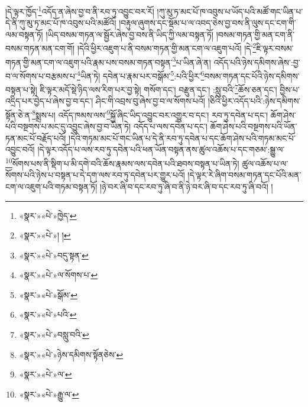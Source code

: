 །དེ་ལྟར་ཁྱོད་\footnote{«སྣར་»«པེ་»ཁྱེད་}འདོད་ན་ཞེས་བྱ་བ་ནི་རབ་ཏུ་འབྱུང་བར་རོ། །ཀུ་མུ་ཏ་མང་པོ་ཁ་འབུས་པ་ཡོད་པའི་མཚོ་གང་ཡིན་པ་དེ་ནི་ཀུ་མུ་ཏ་མང་པོ་ཁ་འབུས་པའི་མཚོའོ། །བརྟུལ་ཞུགས་དང་སྡོམ་པ་ལ་འབད་ཅེས་བྱ་བས་ནི་ལུས་དང་ངག་གི་ལམ་བསྟན་ཏོ། །ཡིད་བསམ་གཏན་ལ་སྦྱོར་ཞེས་བྱ་བས་ནི་ཡིད་ཀྱི་ལམ་བསྟན་ཏོ། །བསམ་གཏན་གྱི་མན་ངག་ནི་བསམ་གཏན་མན་ངག་གོ། །དེའི་ཕྱིར་འཇུག་པ་ནི་བསམ་གཏན་གྱི་མན་ངག་ལ་འཇུག་པའོ། །དེ་\footnote{«སྣར་»«པེ་»། །}ཇི་ལྟར་བསམ་གཏན་གྱི་མན་ངག་ལ་འཇུག་པའི་རྣམ་པས་བསམ་གཏན་བསྟན་\footnote{«སྣར་»«པེ་»བདུ་སྟན་}པ་ཡིན་ཞེ་ན། འདོད་པའི་ཉེས་དམིགས་ཞེས་:བྱ་བ་ལ་སོགས་པ་བརྩམས་པ་\footnote{«སྣར་»«པེ་»ལ་སོགས་པ་}ཡིན་ཏེ། དབེན་པ་རྣམ་པར་བསྒོམ་\footnote{«སྣར་»«པེ་»སྒོམ་}:པའི་ཕྱིར་\footnote{«སྣར་»«པེ་»པའི་}བསམ་གཏན་དང་པོའི་ཉེས་དམིགས་བསྟན་པ་སྟེ། ཇི་ལྟར་མདོ་སྡེ་ཉིད་ལས་རིག་པར་བྱ་སྟེ། གསོག་དང་། བརྫུན་དང་། :སླུ་བའི་\footnote{«སྣར་»«པེ་»བསླུ་བའི་}ཆོས་ཅན་དང་། བྱིས་པ་འདྲིད་པར་བྱེད་པ་ཞེས་བྱ་བ་དང་། ཤིང་གི་འབྲས་བུ་ཞེས་བྱ་བ་ལ་སོགས་པའོ། །ཅིའི་ཕྱིར་འདོད་པའི་:ཉེས་དམིགས་སྟོན་ཅེ་ན་\footnote{«སྣར་»«པེ་»ཉེས་དམིགས་སྟོནཅེས་}སྨྲས་པ། འདོད་ཁམས་ལས་\footnote{«སྣར་»«པེ་»ལ་}སྐྱོ་ཞིང་ཡིད་འབྱུང་བར་འགྱུར་བ་དང་། རབ་ཏུ་དབེན་པ་དང་། ཆོག་ཤེས་པའི་བསྔགས་པ་མང་དུ་འབྱུང་ཞེས་བྱ་བ་ཡིན་ཏེ། འདོད་པ་ལས་དབེན་པ་དང་། ཆོག་ཤེས་པའི་བསྔགས་པའི་ཡོན་ཏན་མང་པོ་བརྗོད་པའོ། །དེའི་གཏམ་མང་པོ་གང་ཡིན་པ་དེ་ནི་རབ་ཏུ་དབེན་པ་དང་ཆོག་ཤེས་པའི་གཏམ་མང་པོ་འབྱུང་བའོ། །དེ་ལྟར་འདོད་པ་ལས་རབ་ཏུ་དབེན་པའི་ཕན་ཡོན་བསྟན་ནས་ཚུལ་འཆོས་པ་དང་གཅམ་:སྒྱུ་ལ་\footnote{«སྣར་»«པེ་»རྒྱུ་ལ་}སོགས་པས་ནི་སྡིག་པ་མི་དགེ་བའི་ཆོས་རྣམས་ལས་དབེན་པའི་ཐབས་བསྟན་པ་ཡིན་ཏེ། ཚུལ་འཆོས་པ་ལ་སོགས་པའི་ཉེས་པ་བསྟན་པ་དེ་དག་ལས་རབ་ཏུ་དབེན་པར་གྱུར་པའོ། །དེ་ལྟར་རེ་ཞིག་བསམ་གཏན་དང་པོའི་མན་ངག་ལ་འཇུག་པའི་གཏམ་བསྟན་ཏོ། །ཉེ་བར་ཞི་བ་དང་རབ་ཏུ་ཞི་བ་ནི་ཉེ་བར་ཞི་བ་དང་རབ་ཏུ་ཞི་བའོ། །
